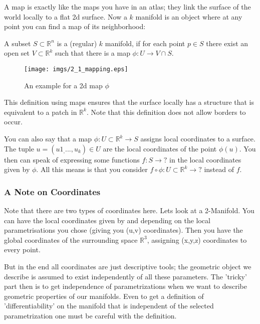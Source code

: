 A map is exactly like the maps you have in an atlas; they link the surface of the world locally to a flat 2d surface. Now a $k$ manifold is an object where at any point you can find a map of its neighborhood:

\begin{definition}[Manifold] A subset $S\subset \mathbb R^n$ is a (regular) $k$ manifold, if for each point $p \in S$ there exist an open set $V\subset \mathbb R^k$ such that there is a map $\phi: U \rightarrow  V\cap S$.
\end{definition} 

	
\begin{figure}
	\begin{center}
		\texttt{[image: imgs/2\_1\_mapping.eps]}
		\caption{An example for a 2d map $\phi$}
		\label{fig::2_1_mapping}
	\end{center}
\end{figure}

This definition using maps ensures that the surface locally has a structure that is equivalent to a patch in $\mathbb R^k$. Note that this definition does not allow borders to occur. 

You can also say that a map $\phi: U \subset \mathbb R^k \rightarrow S$ assigns local coordinates to a surface. The tuple $u=(u1_,...,u_k)\in U$ are the local coordinates of the point $\phi(u)$. You then can speak of expressing some functions $f:S \rightarrow ?$ in the local coordinates given by $\phi$. All this means is that you consider $f \circ \phi : U \subset \mathbb R^k \rightarrow ?$ instead of $f$. %

\subsubsection*{A Note on Coordinates}
Note that there are two types of coordinates here. Lets look at a 2-Manifold. You can have the local coordinates given by and depending on the local parametrisations you chose (giving you (u,v) coordinates). Then you have the global coordinates of the surrounding space $\mathbb R^3$, assigning (x,y,z) coordinates to every point.

But in the end all coordinates are just descriptive tools; the geometric object we describe is assumed to exist independently of all these parameters. The 'tricky' part then is to get independence of parametrizations when we want to describe geometric properties of our manifolds. Even to get a definition of 'differentiability' on the manifold that is independent of the selected parametrization one must be careful with the definition.

